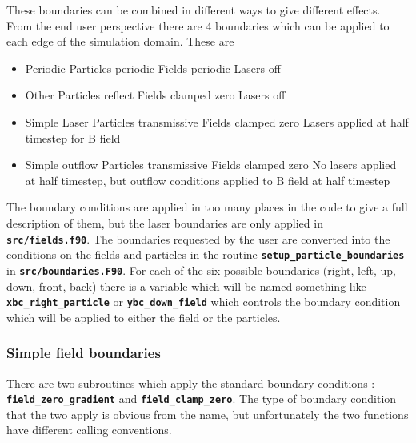 \documentclass[12pt,a4paper]{article}
\newcommand{\inlinecode}[1]{{\color{warwickred} \bf\texttt{#1}}}
\begin{document}
These boundaries can be combined in different ways to give different
effects. From the end user perspective there are 4 boundaries which can be
applied to each edge of the simulation domain. These are
\begin{itemize}
\item Periodic
  \subitem Particles periodic
  \subitem Fields periodic
  \subitem Lasers off
\item Other
  \subitem Particles reflect
  \subitem Fields clamped zero
  \subitem Lasers off
\item Simple Laser
  \subitem Particles transmissive
  \subitem Fields clamped zero
  \subitem Lasers applied at half timestep for B field
\item Simple outflow
  \subitem Particles transmissive
  \subitem Fields clamped zero
  \subitem No lasers applied at half timestep, but outflow conditions applied
  to B field at half timestep
\end{itemize}
The boundary conditions are applied in too many places in the code to give a
full description of them, but the laser boundaries are only applied in
\inlinecode{src/fields.f90}. The boundaries requested by the user are converted
into the conditions on the fields and particles in the routine
\inlinecode{setup\_particle\_boundaries} in
\inlinecode{src/boundaries.F90}. For each of the six possible boundaries
(right, left, up, down, front, back) there is a variable which will be named
something like \inlinecode{xbc\_right\_particle} or
\inlinecode{ybc\_down\_field} which controls the boundary condition which will
be applied to either the field or the particles.

\subsubsection{Simple field boundaries}
There are two subroutines which apply the standard boundary conditions :
\inlinecode{field\_zero\_gradient} and \inlinecode{field\_clamp\_zero}. The
type of boundary condition that the two apply is obvious from the name, but
unfortunately the two functions have different calling conventions.
\end{document}
